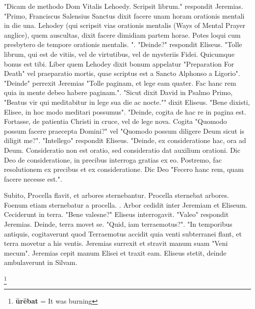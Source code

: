 "Dicam de methodo Dom Vitalis Lehoedy. Scripsit librum." respondit Jeremias. "Primo, Franciscus Salensius Sanctus dixit facere unam horam orationis mentali in die una. Lehodey (qui scripsit vias orationis mentalis (Ways of Mental Prayer anglice), quem auscultas, dixit facere dimidiam partem horae. Potes loqui cum presbytero de tempore orationis mentalis. ". "Deinde?" respondit Eliseus. "Tolle librum, qui est de vitiis, vel de virtutibus, vel de mysteriis Fidei. Quicumque bonus est tibi. Liber quem Lehodey dixit bonum appelatur "Preparation For Death" vel praeparatio mortis, quae scriptus est a Sancto Alphonso a Ligorio". "Deinde" perrexit Jeremias "Tolle paginam, et lege eam quater. Fac hanc rem quia in mente debeo habere paginam.". "Sicut dixit David in Psalmo Primo, "Beatus vir qui meditabitur in lege sua die ac nocte."" dixit Eliseus. "Bene dixisti, Elisee, in hoc modo meditari possumus". "Deinde, cogita de hac re in pagina est. Fortasse, de patientia Christi in cruce, vel de lege nova. Cogita "Quomodo possum facere praecepta Domini?" vel "Quomodo possum diligere Deum sicut is diligit me?". "Intellego" respondit Eliseus. "Deinde, ex consideratione hac, ora ad Deum. Consideratio non est oratio, sed consideratio dat auxilium orationi. Dic Deo de consideratione, in precibus interroga gratias ex eo. Postremo, fac resolutionem ex precibus et ex consideratione. Dic Deo "Fecero hanc rem, quam facere necesse est.". 

Subito, Procella flavit, et arbores sternebantur. Procella sternebat arbores. Foenum etiam sternebatur a procella. . Arbor cedidit inter Jeremiam et Eliseum. Ceciderunt in terra. "Bene valesne?" Eliseus interrogavit. "Valeo" respondit Jeremias.  Deinde, terra movet se. "Quid, iam terraemotus?". "In temporibus antiquis, cogitaverunt quod Terraemotus accidit quia venti subterranei flant, et terra movetur a his ventis. Jeremias surrexit et stravit manum suam "Veni mecum". Jeremias cepit manum Elisei et traxit eam. Eliseus stetit, deinde ambulaverunt in Silvam.

   

\footnote{\textbf{ūrēbat} = It was burning}